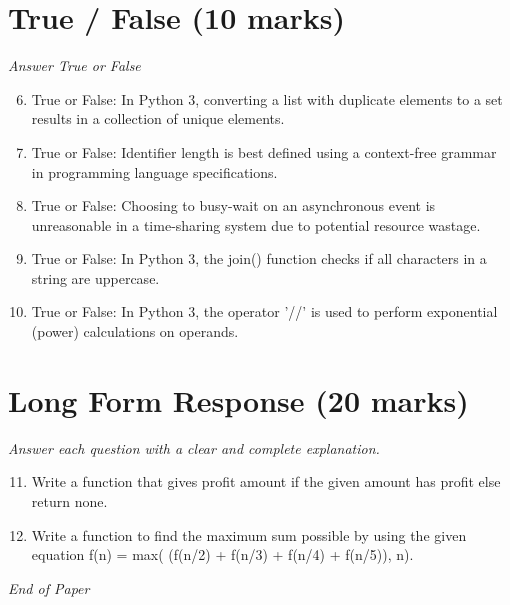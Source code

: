 \documentclass[12pt]{article}
\begin{document}
\section*{True / False (10 marks)}
\textit{Answer True or False}
\begin{enumerate}[label=\arabic*.]
\setcounter{enumi}{5}
\item True or False: In Python 3, converting a list with duplicate elements to a set results in a collection of unique elements.
\item True or False: Identifier length is best defined using a context-free grammar in programming language specifications.
\item True or False: Choosing to busy-wait on an asynchronous event is unreasonable in a time-sharing system due to potential resource wastage.
\item True or False: In Python 3, the join() function checks if all characters in a string are uppercase.
\item True or False: In Python 3, the operator '//' is used to perform exponential (power) calculations on operands.
\end{enumerate}

\section*{Long Form Response (20 marks)}
\textit{Answer each question with a clear and complete explanation.}
\begin{enumerate}[label=\arabic*.]
\setcounter{enumi}{10}
\item Write a function that gives profit amount if the given amount has profit else return none.
\item Write a function to find the maximum sum possible by using the given equation f(n) = max( (f(n/2) + f(n/3) + f(n/4) + f(n/5)), n).
\end{enumerate}

\vfill
\noindent\textit{End of Paper}
\end{document}
